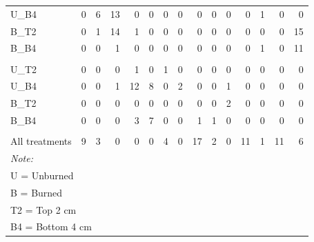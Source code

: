 \documentclass[
  12pt,
]{article}
\begin{document}
\begin{table}[!h]
{\begin{tabular}[t]{lrrrrrrrrrrrrrr}
\hspace{1em}U\_B4 & 0 & 6 & 13 & 0 & 0 & 0 & 0 & 0 & 0 & 0 & 0 & 1 & 0 & 0\\
\hspace{1em}B\_T2 & 0 & 1 & 14 & 1 & 0 & 0 & 0 & 0 & 0 & 0 & 0 & 0 & 0 & 15\\
\hspace{1em}B\_B4 & 0 & 0 & 1 & 0 & 0 & 0 & 0 & 0 & 0 & 0 & 0 & 1 & 0 & 11\\
\addlinespace[0.3em]
\multicolumn{15}{l}{\textit{\textbf{M. gracilis}}}\\
\hspace{1em}U\_T2 & 0 & 0 & 0 & 1 & 0 & 1 & 0 & 0 & 0 & 0 & 0 & 0 & 0 & 0\\
\hspace{1em}U\_B4 & 0 & 0 & 1 & 12 & 8 & 0 & 2 & 0 & 0 & 1 & 0 & 0 & 0 & 0\\
\hspace{1em}B\_T2 & 0 & 0 & 0 & 0 & 0 & 0 & 0 & 0 & 0 & 2 & 0 & 0 & 0 & 0\\
\hspace{1em}B\_B4 & 0 & 0 & 0 & 3 & 7 & 0 & 0 & 1 & 1 & 0 & 0 & 0 & 0 & 0\\
\addlinespace[0.3em]
\multicolumn{15}{l}{\textbf{Other species}}\\
\hspace{1em}All treatments & 9 & 3 & 0 & 0 & 0 & 4 & 0 & 17 & 2 & 0 & 11 & 1 & 11 & 6\\
\bottomrule
\multicolumn{15}{l}{\rule{0pt}{1em}\textit{Note: }}\\
\multicolumn{15}{l}{\rule{0pt}{1em}U = Unburned}\\
\multicolumn{15}{l}{\rule{0pt}{1em}B = Burned}\\
\multicolumn{15}{l}{\rule{0pt}{1em}T2 = Top 2 cm}\\
\multicolumn{15}{l}{\rule{0pt}{1em}B4 = Bottom 4 cm}\\
\end{tabular}}
\end{table}

\newpage
\end{document}
